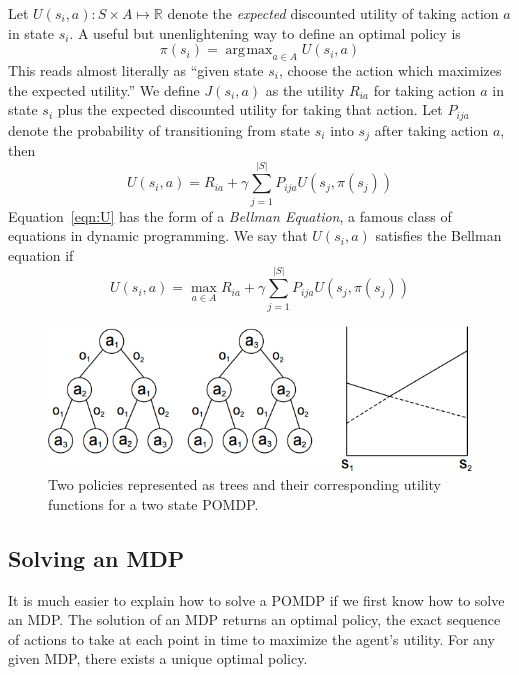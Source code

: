 \documentclass[tog]{acmsiggraph}
\newcommand{\reals}{\mathbb{R}}
\DeclareMathOperator*{\argmax}{\arg\!\max}
\begin{document}
Let $U \left( s_i, a \right) : S \times A \mapsto \reals$ denote the \textit{expected} 
discounted utility of taking action $a$ in state $s_i$. A useful but unenlightening 
way to define an optimal policy is
\begin{equation*}
  \pi \left(s_i \right) = \argmax_{a \in A} U \left( s_i, a \right)
\end{equation*}
This reads almost literally as ``given state $s_i$, choose the action which maximizes 
the expected utility.'' We define $J \left( s_i, a \right)$ as the utility $R_{ia}$ for 
taking action $a$ in state $s_i$ plus the expected discounted utility for taking that 
action. Let $P_{ija}$ denote the probability of transitioning from state $s_i$ into $s_j$ 
after taking action $a$, then
\begin{equation} \label{eqn:U}
  U \left( s_i, a \right) = R_{ia} + \gamma \sum_{j=1}^{\left| S \right|} P_{ija} U \left( s_j, \pi \left( s_j \right) \right)
\end{equation}
Equation~\ref{eqn:U} has the form of a \textit{Bellman Equation}, a famous class of equations in dynamic programming.
We say that $U \left( s_i, a \right)$ satisfies the Bellman equation if
\begin{equation*}
  U \left( s_i, a \right) = \max_{a \in A} R_{ia} + \gamma \sum_{j=1}^{\left| S \right|} P_{ija} U \left( s_j, \pi \left( s_j \right) \right)
\end{equation*}

\begin{figure}[h]
  \centering
  \includegraphics[scale=0.4]{valueTrees.png}
  \caption{Two policies represented as trees and their corresponding utility functions for a two state POMDP.~\protect\cite{hansen2004dynamic}}
  \label{fig:valueTrees}
\end{figure}

\subsection{Solving an MDP}
It is much easier to explain how to solve a POMDP if we first know how to solve an MDP.\@
The solution of an MDP returns an optimal policy, the exact sequence of actions to take 
at each point in time to maximize the agent's utility. For any given MDP, there exists a 
unique optimal policy.
\end{document}

